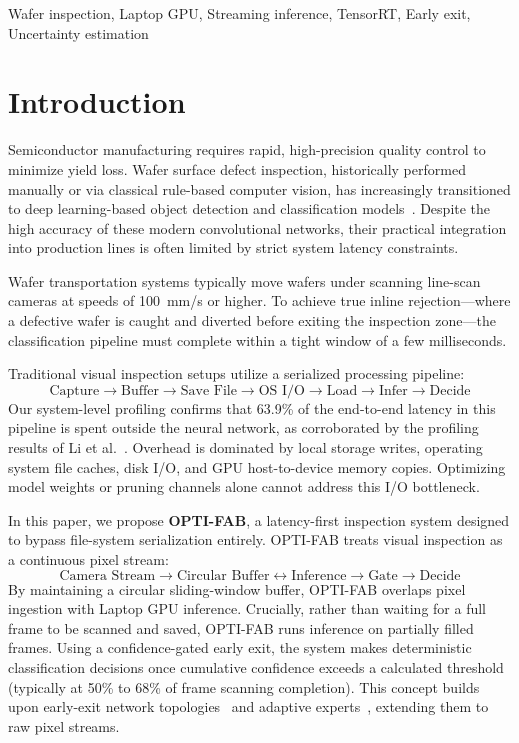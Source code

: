 \documentclass[conference]{IEEEtran}
\begin{document}
\begin{IEEEkeywords}
Wafer inspection, Laptop GPU, Streaming inference, TensorRT, Early exit, Uncertainty estimation
\end{IEEEkeywords}

\section{Introduction}
Semiconductor manufacturing requires rapid, high-precision quality control to minimize yield loss. Wafer surface defect inspection, historically performed manually or via classical rule-based computer vision, has increasingly transitioned to deep learning-based object detection and classification models~\cite{luan2020wafer, zhao2023yolov8}. Despite the high accuracy of these modern convolutional networks, their practical integration into production lines is often limited by strict system latency constraints.

Wafer transportation systems typically move wafers under scanning line-scan cameras at speeds of 100~mm/s or higher. To achieve true inline rejection---where a defective wafer is caught and diverted before exiting the inspection zone---the classification pipeline must complete within a tight window of a few milliseconds. 

Traditional visual inspection setups utilize a serialized processing pipeline:
\begin{equation}
\text{Capture} \rightarrow \text{Buffer} \rightarrow \text{Save File} \rightarrow \text{OS I/O} \rightarrow \text{Load} \rightarrow \text{Infer} \rightarrow \text{Decide}
\end{equation}
Our system-level profiling confirms that 63.9\% of the end-to-end latency in this pipeline is spent outside the neural network, as corroborated by the profiling results of Li et al.~\cite{li2024edge}. Overhead is dominated by local storage writes, operating system file caches, disk I/O, and GPU host-to-device memory copies. Optimizing model weights or pruning channels alone cannot address this I/O bottleneck.

In this paper, we propose \textbf{OPTI-FAB}, a latency-first inspection system designed to bypass file-system serialization entirely. OPTI-FAB treats visual inspection as a continuous pixel stream:
\begin{equation}
\text{Camera Stream} \rightarrow \text{Circular Buffer} \leftrightarrow \text{Inference} \rightarrow \text{Gate} \rightarrow \text{Decide}
\end{equation}
By maintaining a circular sliding-window buffer, OPTI-FAB overlaps pixel ingestion with Laptop GPU inference. Crucially, rather than waiting for a full frame to be scanned and saved, OPTI-FAB runs inference on partially filled frames. Using a confidence-gated early exit, the system makes deterministic classification decisions once cumulative confidence exceeds a calculated threshold (typically at 50\% to 68\% of frame scanning completion). This concept builds upon early-exit network topologies~\cite{teerapittayanon2016branchynet, rahmath2024early} and adaptive experts~\cite{bajpai2025beem, mokssit2025confidence}, extending them to raw pixel streams.
\end{document}
